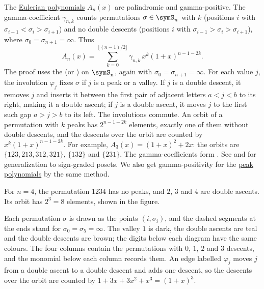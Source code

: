 \begin{theorem}
The \hyperref[eulerianPolynomial]{Eulerian polynomials} $A_n(x)$ are
palindromic and gamma-positive.
The gamma-coefficient $\gamma_{n,k}$ counts permutations $\sigma \in \symS_n$
with $k$ \label{permutationPeak}
(positions $i$ with $\sigma_{i-1} < \sigma_i > \sigma_{i+1}$) and no double
descents (positions $i$ with $\sigma_{i-1}>\sigma_i>\sigma_{i+1}$), where
$\sigma_0=\sigma_{n+1}=\infty$.
Thus
\[
 A_n(x) = \sum_{k=0}^{\lfloor (n-1)/2 \rfloor} \gamma_{n,k}\, x^k(1+x)^{n-1-2k}.
\]
The proof uses the \label{foataStrehlAction}
(or \label{valleyHoppingAction}) on $\symS_n$,
again with $\sigma_0=\sigma_{n+1}=\infty$.  For each value $j$, the
involution $\varphi_j$ fixes $\sigma$ if $j$ is a peak or a valley.  If $j$
is a double descent, it removes $j$ and inserts it between the first pair of
adjacent letters $a\lt j\lt b$ to its right, making it a double ascent;
if $j$ is a double ascent, it moves $j$ to the first such gap
$a\gt j\gt b$ to its left.  The
involutions commute.  An orbit of a permutation with $k$ peaks has
$2^{n-1-2k}$ elements, exactly one of them without double descents, and the
descents over the orbit are counted by $x^k(1+x)^{n-1-2k}$.
For example, $A_3(x)=(1+x)^2+2x$: the orbits are
$\{123,213,312,321\}$, $\{132\}$ and $\{231\}$.
The gamma-coefficients form .
See \cite{Athanasiadis2018} and \cite{Branden2008} for generalization to sign-graded posets.
We also get gamma-positivity for the
\hyperref[ex:peakSturm]{peak polynomials} by the same method.
\end{theorem}

\begin{example*}
For $n=4$, the permutation $1234$ has no peaks, and $2$, $3$ and $4$ are
double ascents.  Its orbit has $2^3=8$ elements, shown in the figure.
\begin{figure}
\end{figure}

Each permutation $\sigma$ is drawn as the points $(i,\sigma_i)$, and the
dashed segments at the ends stand for $\sigma_0=\sigma_5=\infty$.  The valley
$1$ is dark, the double ascents are teal and the double descents are brown;
the digits below each diagram have the same colours.  The four columns
contain the permutations with $0$, $1$, $2$ and $3$ descents, and the
monomial below each column records them.  An edge labelled $\varphi_j$ moves
$j$ from a double ascent to a double descent and adds one descent, so the
descents over the orbit are counted by $1+3x+3x^2+x^3=(1+x)^3$.
\end{example*}


